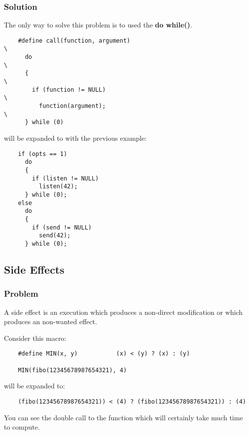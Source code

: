 \documentclass[9pt]{beamer}
\newcommand{\nl}[0]{\vspace{0.4cm}}
\begin{document}

\begin{frame}[containsverbatim]
  \frametitle{Solution}

  The only way to solve this problem is to used the \textbf{do while()}.

  \begin{verbatim}
    #define call(function, argument)                                    \
      do                                                                \
      {                                                                 \
        if (function != NULL)                                           \
          function(argument);                                           \
      } while (0)
  \end{verbatim}

  will be expanded to with the previous example:

  \begin{verbatim}
    if (opts == 1)
      do
      {
        if (listen != NULL)
          listen(42);
      } while (0);
    else
      do
      {
        if (send != NULL)
          send(42);
      } while (0);
  \end{verbatim}
\end{frame}

%
%

\subsection{Side Effects}


\begin{frame}[containsverbatim]
  \frametitle{Problem}

  A side effect is an execution which produces a non-direct modification
  or which produces an non-wanted effect.

  \nl

  Consider this macro:

  \begin{verbatim}
    #define MIN(x, y)           (x) < (y) ? (x) : (y)

    MIN(fibo(12345678987654321), 4)
  \end{verbatim}

  will be expanded to:

  \begin{verbatim}
    (fibo(12345678987654321)) < (4) ? (fibo(12345678987654321)) : (4)
  \end{verbatim}

  You can see the double call to the function which will certainly take
  much time to compute.
\end{frame}
\end{document}
